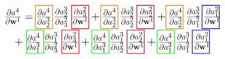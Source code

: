 \documentclass[11pt]{article}
\begin{document}
\begin{equation}\label{eq:chain_rule}
  \begin{tikzpicture}[baseline=(current bounding box.center),thick,scale=0.8, every node/.style={scale=0.8}]
    \node (A) at (0,1.3) {
      \LARGE{$
          \frac{\partial a^{4}}{\partial \mathbf{w}^{1}} =  
          \frac{\partial a^{4}}{\partial a_{2}^{3}}\; \frac{\partial a_{2}^{3}}{\partial a_{3}^{2}}\;\frac{\partial a_{3}^{2}}{\partial \mathbf{w}^{1}} 
          + \frac{\partial a^{4}}{\partial a_{2}^{3}}\; \frac{\partial a_{2}^{3}}{\partial a_{2}^{2}}\;\frac{\partial a_{2}^{2}}{\partial \mathbf{w}^{1}} 
          + \frac{\partial a^{4}}{\partial a_{2}^{3}}\; \frac{\partial a_{2}^{3}}{\partial a_{1}^{2}}\;\frac{\partial a_{1}^{2}}{\partial \mathbf{w}^{1}}
        $}
    };

    \node (B) at (0,0) {
      \LARGE{$
          +\; \frac{\partial a^{4}}{\partial a_{1}^{3}} \;\frac{\partial a_{1}^{3}}{\partial a_{3}^{2}}\;\frac{\partial a_{3}^{2}}{\partial \mathbf{w}^{1}} 
          + \frac{\partial a^{4}}{\partial a_{1}^{3}} \;\frac{\partial a_{1}^{3}}{\partial a_{2}^{2}}\;\frac{\partial a_{2}^{2}}{\partial \mathbf{w}^{1}} 
          + \frac{\partial a^{4}}{\partial a_{1}^{3}} \;\frac{\partial a_{1}^{3}}{\partial a_{1}^{2}}\;\frac{\partial a_{1}^{2}}{\partial \mathbf{w}^{1}}
        $}
    };

    \foreach \Rnumber in {0,...,2} {
      \draw[thick,orange] (\tbdis*\Rnumber + \xbase,\ybase) -- (\tbdis*\Rnumber + \xbase,\ybase + \hibox) -- (\tbdis*\Rnumber + \xbase + \wibox,\ybase + \hibox) -- (\tbdis*\Rnumber + \xbase + \wibox,\ybase) -- (\tbdis*\Rnumber + \xbase,\ybase);
    }

    \foreach \Rnumber in {0,...,2} {
      \draw[thick,green] (\bbdis*\Rnumber + \xbase + \xbshift,\ybase+\ybshift) -- (\bbdis*\Rnumber + \xbase + \xbshift,\ybase+\ybshift + \hibox) -- (\bbdis*\Rnumber + \xbase + \xbshift + \wibox,\ybase+\ybshift + \hibox) -- (\bbdis*\Rnumber + \xbase + \xbshift + \wibox,\ybase+\ybshift) -- (\bbdis*\Rnumber + \xbase + \xbshift,\ybase+\ybshift);
    }

    \foreach \Rnumber/\c in {0/red,1/purple,2/blue} {%
      \draw[thick,\c] (\tbdis*\Rnumber + \xbase + \xotshift,\ybase) -- (\tbdis*\Rnumber + \xbase + \xotshift,\ybase + \hibox) -- (\tbdis*\Rnumber + \xbase + \xotshift + \wibox,\ybase + \hibox) -- (\tbdis*\Rnumber + \xbase + \xotshift + \wibox,\ybase) -- (\tbdis*\Rnumber + \xbase + \xotshift,\ybase);
    }

    \foreach \Rnumber/\c in {0/red,1/purple,2/blue} {%
      \draw[thick,\c] (\bbdis*\Rnumber + \xbase + \xobshift,\ybase+\ybshift) -- (\bbdis*\Rnumber + \xbase + \xobshift,\ybase+\ybshift + \hibox) -- (\bbdis*\Rnumber + \xbase + \xobshift + \wibox,\ybase+\ybshift + \hibox) -- (\bbdis*\Rnumber + \xbase + \xobshift + \wibox,\ybase+\ybshift) -- (\bbdis*\Rnumber + \xbase + \xobshift,\ybase+\ybshift);
    }
  \end{tikzpicture}
\end{equation}
\end{document}
